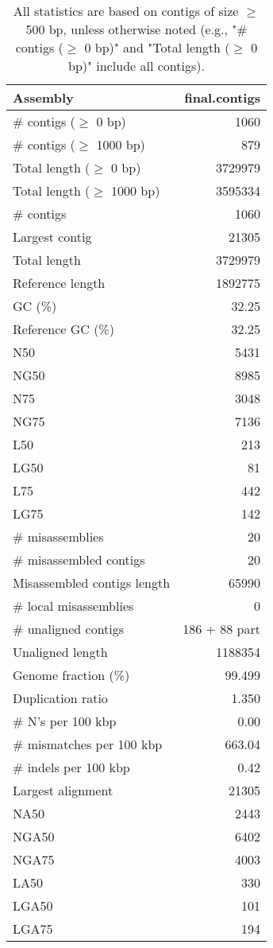 \documentclass[12pt,a4paper]{article}
\begin{document}
\begin{table}[ht]
\begin{center}
\caption{All statistics are based on contigs of size $\geq$ 500 bp, unless otherwise noted (e.g., "\# contigs ($\geq$ 0 bp)" and "Total length ($\geq$ 0 bp)" include all contigs).}
\begin{tabular}{|l*{1}{|r}|}
\hline
Assembly & final.contigs \\ \hline
\# contigs ($\geq$ 0 bp) & 1060 \\ \hline
\# contigs ($\geq$ 1000 bp) & 879 \\ \hline
Total length ($\geq$ 0 bp) & 3729979 \\ \hline
Total length ($\geq$ 1000 bp) & 3595334 \\ \hline
\# contigs & 1060 \\ \hline
Largest contig & 21305 \\ \hline
Total length & 3729979 \\ \hline
Reference length & 1892775 \\ \hline
GC (\%) & 32.25 \\ \hline
Reference GC (\%) & 32.25 \\ \hline
N50 & 5431 \\ \hline
NG50 & 8985 \\ \hline
N75 & 3048 \\ \hline
NG75 & 7136 \\ \hline
L50 & 213 \\ \hline
LG50 & 81 \\ \hline
L75 & 442 \\ \hline
LG75 & 142 \\ \hline
\# misassemblies & 20 \\ \hline
\# misassembled contigs & 20 \\ \hline
Misassembled contigs length & 65990 \\ \hline
\# local misassemblies & 0 \\ \hline
\# unaligned contigs & 186 + 88 part \\ \hline
Unaligned length & 1188354 \\ \hline
Genome fraction (\%) & 99.499 \\ \hline
Duplication ratio & 1.350 \\ \hline
\# N's per 100 kbp & 0.00 \\ \hline
\# mismatches per 100 kbp & 663.04 \\ \hline
\# indels per 100 kbp & 0.42 \\ \hline
Largest alignment & 21305 \\ \hline
NA50 & 2443 \\ \hline
NGA50 & 6402 \\ \hline
NGA75 & 4003 \\ \hline
LA50 & 330 \\ \hline
LGA50 & 101 \\ \hline
LGA75 & 194 \\ \hline
\end{tabular}
\end{center}
\end{table}
\end{document}
